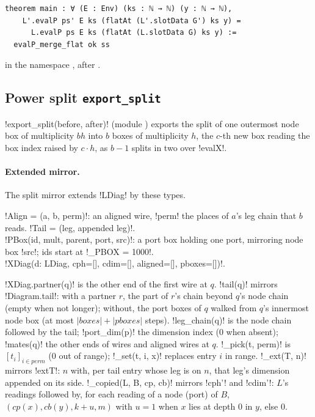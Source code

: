 {{{\begin{algorithm}
\begin{enumerate}
\begin{lstlisting}[style=lexlean]
theorem main : ∀ (E : Env) (ks : ℕ → ℕ) (y : ℕ → ℕ),
    L'.evalP ps' E ks (flatAt (L'.slotData G') ks y) =
      L.evalP ps E ks (flatAt (L.slotData G) ks y) :=
  evalP_merge_flat ok ss
\end{lstlisting}
in the namespace , after .
\end{enumerate}
\end{algorithm}

\subsection{Power split \texttt{export\_split}}\label{sec:lean-export-split}

\lexpy!export_split(before, after)! (module ) exports the
split of one outermost node box of multiplicity $bh$ into $b$ boxes of multiplicity $h$, the
$c$-th new box reading the box index raised by $c\cdot h$, as $b-1$ splits in two over
\lexlean!evalX!.

\paragraph{Extended mirror.} The split mirror extends \lexpy!LDiag! by these types.
\begin{signature}
\lexpy!Align = (a, b, perm)!: an aligned wire, \lexcode!perm! the places of $a$'s leg chain that $b$
reads. \lexpy!Tail = (leg, appended leg)!.\\
\lexpy!PBox(id, mult, parent, port, src)!: a port box holding one port, mirroring node box
\lexcode!src!; ids start at \lexpy!_PBOX = 1000!.\\
\lexpy!XDiag(d: LDiag, cph=[], cdim=[], aligned=[], pboxes=[])!.
\end{signature}
\lexpy!XDiag.partner(q)! is the other end of the first wire at $q$. \lexpy!tail(q)! mirrors
\lexlean!Diagram.tail!: with a partner $r$, the part of $r$'s chain beyond $q$'s node chain (empty
when not longer); without, the port boxes of $q$ walked from $q$'s innermost node box (at most
$|\mathit{boxes}| + |\mathit{pboxes}|$ steps). \lexpy!leg_chain(q)! is the node chain followed by
the tail; \lexpy!port_dim(p)! the dimension index (0 when absent); \lexpy!mates(q)! the other ends of
wires and aligned wires at $q$. \lexpy!_pick(t, perm)! is $[t_i]_{i \in \mathit{perm}}$ (0 out of
range); \lexpy!_set(t, i, x)! replaces entry $i$ in range. \lexpy!_ext(T, n)! mirrors \lexlean!extT!: $n$
with, per tail entry whose leg is on $n$, that leg's dimension appended on its side.
\lexpy!_copied(L, B, cp, cb)! mirrors \lexlean!cph'! and \lexlean!cdim'!: $L$'s readings followed by, for
each reading of a node (port) of $B$, $(\mathit{cp}(x), \mathit{cb}(y), k + u, m)$ with $u = 1$
when $x$ lies at depth 0 in $y$, else $0$.

}}}
